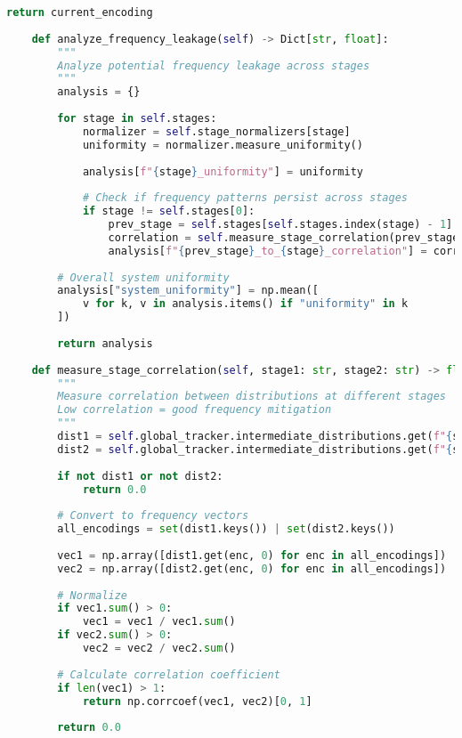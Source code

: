 \begin{lstlisting}[language=Python, caption={Multi-stage frequency mitigation}]
        return current_encoding
    
    def analyze_frequency_leakage(self) -> Dict[str, float]:
        """
        Analyze potential frequency leakage across stages
        """
        analysis = {}
        
        for stage in self.stages:
            normalizer = self.stage_normalizers[stage]
            uniformity = normalizer.measure_uniformity()
            
            analysis[f"{stage}_uniformity"] = uniformity
            
            # Check if frequency patterns persist across stages
            if stage != self.stages[0]:
                prev_stage = self.stages[self.stages.index(stage) - 1]
                correlation = self.measure_stage_correlation(prev_stage, stage)
                analysis[f"{prev_stage}_to_{stage}_correlation"] = correlation
        
        # Overall system uniformity
        analysis["system_uniformity"] = np.mean([
            v for k, v in analysis.items() if "uniformity" in k
        ])
        
        return analysis
    
    def measure_stage_correlation(self, stage1: str, stage2: str) -> float:
        """
        Measure correlation between distributions at different stages
        Low correlation = good frequency mitigation
        """
        dist1 = self.global_tracker.intermediate_distributions.get(f"{stage1}_post", {})
        dist2 = self.global_tracker.intermediate_distributions.get(f"{stage2}_pre", {})
        
        if not dist1 or not dist2:
            return 0.0
        
        # Convert to frequency vectors
        all_encodings = set(dist1.keys()) | set(dist2.keys())
        
        vec1 = np.array([dist1.get(enc, 0) for enc in all_encodings])
        vec2 = np.array([dist2.get(enc, 0) for enc in all_encodings])
        
        # Normalize
        if vec1.sum() > 0:
            vec1 = vec1 / vec1.sum()
        if vec2.sum() > 0:
            vec2 = vec2 / vec2.sum()
        
        # Calculate correlation coefficient
        if len(vec1) > 1:
            return np.corrcoef(vec1, vec2)[0, 1]
        
        return 0.0
\end{lstlisting}

